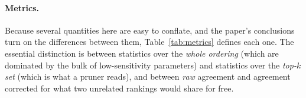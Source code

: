 \documentclass{article}
\begin{document}
\paragraph{Metrics.}
Because several quantities here are easy to conflate, and the paper's conclusions turn on
the differences between them, Table~\ref{tab:metrics} defines each one. The essential
distinction is between statistics over the \emph{whole ordering} (which are dominated by
the bulk of low-sensitivity parameters) and statistics over the \emph{top-$k$ set} (which
is what a pruner reads), and between \emph{raw} agreement and agreement corrected for what
two unrelated rankings would share for free.
\end{document}
